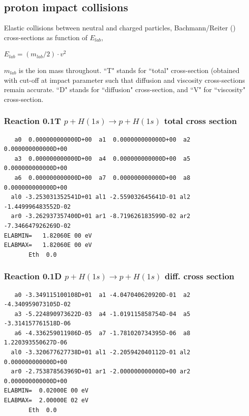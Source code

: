 \documentclass[12pt,dvipdfmx]{article}
\begin{document}
\newpage

\subsection{proton impact collisions}\label{sect1.1}
\bigskip
Elastic collisions between neutral and charged particles,
Bachmann/Reiter (\cite{kn:Bachmann})
cross-sections as function of $E_{lab}$,

$E_{lab} = (m_{lab}/2) \cdot v^2$

$m_{lab}$ is the ion mass throughout. ``T" stands for ``total" cross-section (obtained  with cut-off
at impact parameter such that diffusion and viscosity cross-sections remain accurate.
``D" stands for ``diffusion" cross-section, and ``V" for ``viscosity" cross-section.

\subsubsection{
Reaction 0.1T $p + H(1s) \rightarrow p + H(1s) $ total cross
section}

\begin{small}\begin{verbatim}
   a0  0.000000000000D+00  a1  0.000000000000D+00  a2  0.000000000000D+00
   a3  0.000000000000D+00  a4  0.000000000000D+00  a5  0.000000000000D+00
   a6  0.000000000000D+00  a7  0.000000000000D+00  a8  0.000000000000D+00
  al0 -3.253031352541D+01 al1 -2.559032645641D-01 al2 -1.449996483552D-02
  ar0 -3.262937357400D+01 ar1 -8.719626183599D-02 ar2 -7.346647926269D-02
ELABMIN=   1.82060E 00 eV
ELABMAX=   1.82060E 00 eV
       Eth  0.0
\end{verbatim}\end{small}



\subsubsection{
Reaction 0.1D    $ p + H(1s) \rightarrow p + H(1s)$  diff. cross
section}


\begin{small}\begin{verbatim}
   a0 -3.349115100108D+01  a1 -4.047040620920D-01  a2 -4.340959073105D-02
   a3 -5.224890973622D-03  a4 -1.019115858754D-04  a5 -3.314157761518D-06
   a6 -4.336259011986D-05  a7 -1.781020734395D-06  a8  1.220393550627D-06
  al0 -3.320677627738D+01 al1 -2.205942040112D-01 al2  0.000000000000D+00
  ar0 -2.753878563969D+01 ar1 -2.000000000000D+00 ar2  0.000000000000D+00
ELABMIN=  0.02000E 00 eV
ELABMAX=  2.00000E 02 eV
       Eth  0.0
\end{verbatim}\end{small}
\end{document}
